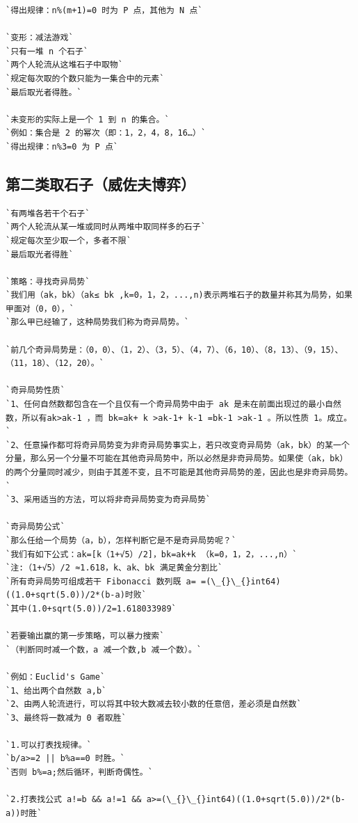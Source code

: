 \documentclass[a4paper]{article}
\begin{document}
\begin{CJK*}{UTF8}{gbsn}
\begin{multicols}{3}
\begin{flushleft}
\begin{lstlisting}
`得出规律：n%(m+1)=0 时为 P 点，其他为 N 点`

`变形：减法游戏`
`只有一堆 n 个石子`
`两个人轮流从这堆石子中取物`
`规定每次取的个数只能为一集合中的元素`
`最后取光者得胜。`

`未变形的实际上是一个 1 到 n 的集合。`
`例如：集合是 2 的幂次（即：1，2，4，8，16…）`
`得出规律：n%3=0 为 P 点`
\end{lstlisting}

\subsection{第二类取石子（威佐夫博弈）}
\begin{lstlisting}
`有两堆各若干个石子`
`两个人轮流从某一堆或同时从两堆中取同样多的石子`
`规定每次至少取一个，多者不限`
`最后取光者得胜`

`策略：寻找奇异局势`
`我们用（ak，bk）（ak≤ bk ,k=0，1，2，...,n)表示两堆石子的数量并称其为局势，如果甲面对（0，0），`
`那么甲已经输了，这种局势我们称为奇异局势。`

`前几个奇异局势是：（0，0）、（1，2）、（3，5）、（4，7）、（6，10）、（8，13）、（9，15）、（11，18）、（12，20）。`

`奇异局势性质`
`1、任何自然数都包含在一个且仅有一个奇异局势中由于 ak 是未在前面出现过的最小自然数，所以有ak>ak-1 ，而 bk=ak+ k >ak-1+ k-1 =bk-1 >ak-1 。所以性质 1。成立。`
`2、任意操作都可将奇异局势变为非奇异局势事实上，若只改变奇异局势（ak，bk）的某一个分量，那么另一个分量不可能在其他奇异局势中，所以必然是非奇异局势。如果使（ak，bk）的两个分量同时减少，则由于其差不变，且不可能是其他奇异局势的差，因此也是非奇异局势。`
`3、采用适当的方法，可以将非奇异局势变为奇异局势`

`奇异局势公式`
`那么任给一个局势（a，b），怎样判断它是不是奇异局势呢？`
`我们有如下公式：ak=[k（1+√5）/2]，bk=ak+k （k=0，1，2，...,n）`
`注:（1+√5）/2 ≈1.618，k、ak、bk 满足黄金分割比`
`所有奇异局势可组成若干 Fibonacci 数列既 a= =(\_{}\_{}int64)((1.0+sqrt(5.0))/2*(b-a)时败`
`其中(1.0+sqrt(5.0))/2=1.618033989`

`若要输出赢的第一步策略，可以暴力搜索`
`（判断同时减一个数，a 减一个数,b 减一个数）。`

`例如：Euclid's Game`
`1、给出两个自然数 a,b`
`2、由两人轮流进行，可以将其中较大数减去较小数的任意倍，差必须是自然数`
`3、最终将一数减为 0 者取胜`

`1.可以打表找规律。`
`b/a>=2 || b%a==0 时胜。`
`否则 b%=a;然后循环，判断奇偶性。`

`2.打表找公式 a!=b && a!=1 && a>=(\_{}\_{}int64)((1.0+sqrt(5.0))/2*(b-a))时胜`
\end{lstlisting}


\end{flushleft}
\end{multicols}
\end{CJK*}
\end{document}
